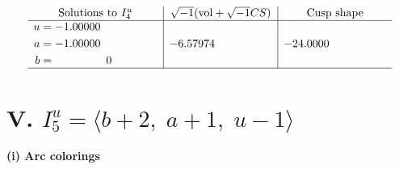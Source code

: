 \documentclass[1p]{elsarticle_modified}
\theoremstyle{definition}
\newcommand{\I}{\sqrt{-1}}
\begin{document}
$$\begin{array}{c|c|c}  
\text{Solutions to }I^u_{4}& \I (\text{vol} + \sqrt{-1}CS) & \text{Cusp shape}\\
 \hline 
\begin{aligned}
u &= -1.00000\phantom{ +0.000000I} \\
a &= -1.00000\phantom{ +0.000000I} \\
b &= \phantom{-0.000000 } 0\end{aligned}
 & -6.57974\phantom{ +0.000000I} & -24.0000\phantom{ +0.000000I}\\
 \hline 
 \end{array}$$\newpage\newpage\renewcommand{\arraystretch}{1}
\centering \section*{V. $I^u_{5}= \langle b+2,\;a+1,\;u-1 \rangle$}
\flushleft \textbf{(i) Arc colorings}\\
\end{document}
